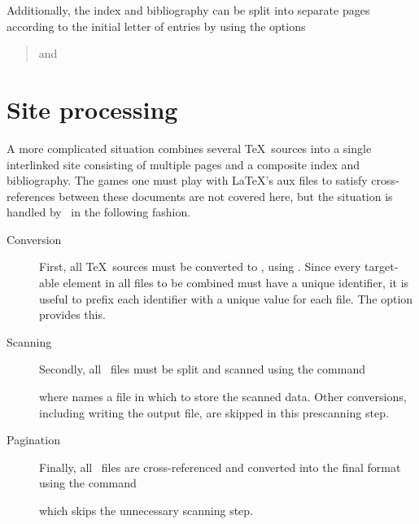 \documentclass{book}
\begin{document}
Additionally, the index and bibliography can be split
into separate pages according to the initial letter of entries by using the options
\begin{quote}
   and 
\end{quote}

\section[Sites]{Site processing}\label{usage.site}
A more complicated situation combines several \TeX\ sources
into a single interlinked site consisting of multiple pages
and a composite index and bibliography.
The games one must play with \LaTeX's aux files to satisfy cross-references
between these documents are not covered here, but the situation is handled
by \LaTeXML\ in the following fashion.

\begin{description}
\item[Conversion] First, all \TeX\ sources must be converted
   to \XML, using .  Since every target-able element
   in all files to be combined must have a unique identifier, it is useful to
   prefix each identifier with a unique value for each file. 
   The  option  provides this.

 \item[Scanning] Secondly, all \XML\ files must be split and scanned using
  the command
  \begin{quote}
  \end{quote}
  where  names a file in which to store the scanned data.
  Other conversions, including writing the output file, are skipped in this prescanning step.
 
 \item[Pagination] Finally, all \XML\ files are cross-referenced and converted into
   the final format using the command
   \begin{quote}
   \end{quote}
   which skips the unnecessary scanning step.
\end{description}

\end{document}
